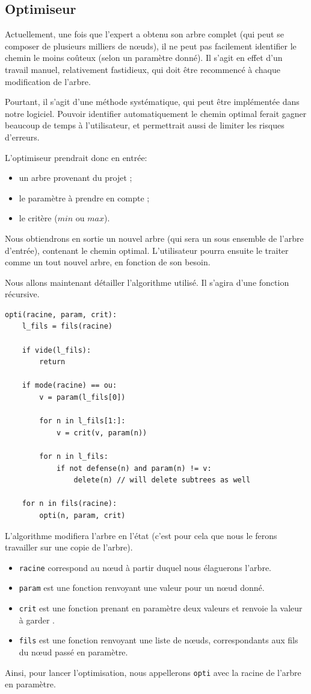 	\subsection{Optimiseur}

		Actuellement, une fois que l'expert a obtenu son arbre complet (qui peut se composer de plusieurs milliers de nœuds), il ne peut pas facilement identifier le chemin le moins coûteux (selon un paramètre donné).
		Il s'agit en effet d'un travail manuel, relativement fastidieux, qui doit être recommencé à chaque modification de l'arbre.
		
		Pourtant, il s'agit d'une méthode systématique, qui peut être implémentée dans notre logiciel. Pouvoir identifier automatiquement le chemin optimal ferait gagner beaucoup de temps à l'utilisateur, et permettrait aussi de limiter les risques d'erreurs.
		
		L'optimiseur prendrait donc en entrée:
		\begin{itemize}
			\item un arbre provenant du projet ;
			\item le paramètre à prendre en compte ;
			\item le critère ($min$ ou $max$).
		\end{itemize}
		
		Nous obtiendrons en sortie un nouvel arbre (qui sera un sous ensemble de l'arbre d'entrée), contenant le chemin optimal. 
		L'utilisateur pourra ensuite le traiter comme un tout nouvel arbre, en fonction de son besoin.
		
		Nous allons maintenant détailler l'algorithme utilisé. Il s'agira d'une fonction récursive.

		\begin{lstlisting}
opti(racine, param, crit):
	l_fils = fils(racine)

	if vide(l_fils):
		return

	if mode(racine) == ou:
		v = param(l_fils[0])

		for n in l_fils[1:]:
			v = crit(v, param(n))

		for n in l_fils:
			if not defense(n) and param(n) != v:
				delete(n) // will delete subtrees as well
	
	for n in fils(racine):
		opti(n, param, crit)
		\end{lstlisting}

		L'algorithme modifiera l'arbre en l'état (c'est pour cela que nous le ferons travailler sur une copie de l'arbre).
		\begin{itemize}
			\item \verb|racine| correspond au nœud à partir duquel nous élaguerons l'arbre.
			\item \verb|param| est une fonction renvoyant une valeur pour un nœud donné.
			\item \verb|crit| est une fonction prenant en paramètre deux valeurs et renvoie la valeur à \og garder \fg.
			\item \verb|fils| est une fonction renvoyant une liste de nœuds, correspondants aux fils du nœud passé en paramètre.
		\end{itemize}
		Ainsi, pour lancer l'optimisation, nous appellerons \verb|opti| avec la racine de l'arbre en paramètre.


